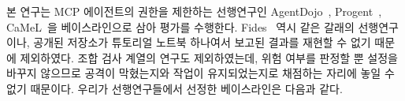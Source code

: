 \documentclass[acmsmall,screen,review,anonymous]{acmart}
\begin{document}
본 연구는 MCP 에이전트의 권한을 제한하는 선행연구인 AgentDojo~\cite{debenedetti2024agentdojo}, Progent~\cite{shi2025progent}, CaMeL~\cite{debenedetti2025defeating}을 베이스라인으로 삼아 평가를 수행한다. Fides~\cite{costa2025securing} 역시 같은 갈래의 선행연구이나, 공개된 저장소가 튜토리얼 노트북 하나여서 보고된 결과를 재현할 수 없기 때문에 제외하였다. 조합 검사 계열의 연구도 제외하였는데, 위험 여부를 판정할 뿐 설정을 바꾸지 않으므로 공격이 막혔는지와 작업이 유지되었는지로 채점하는 자리에 놓일 수 없기 때문이다. 우리가 선행연구들에서 선정한 베이스라인은 다음과 같다.
\end{document}
